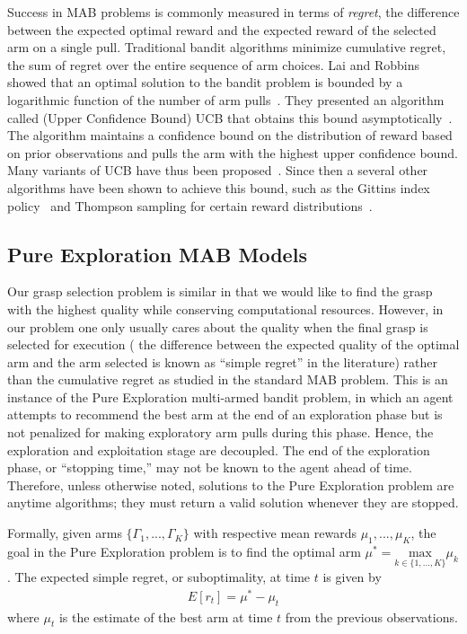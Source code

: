 \documentclass[journal,transmag]{IEEEtran}%
\begin{document}
Success in MAB problems is commonly measured in terms of {\it regret}, the difference between the expected optimal reward and the expected reward of the selected arm on a single pull.
Traditional bandit algorithms minimize cumulative regret, the sum of regret over the entire sequence of arm choices.
Lai and Robbins showed that an optimal solution to the bandit problem is bounded by a logarithmic function of the number of arm pulls~\cite{lai1985asymptotically}.
They presented an algorithm called (Upper Confidence Bound) UCB that obtains this bound asymptotically~\cite{lai1985asymptotically}.
The algorithm maintains a confidence bound on the distribution of reward based on prior observations and pulls the arm with the highest upper confidence bound.
Many variants of UCB have thus been proposed~\cite{}. 
Since then a several other algorithms have been shown to achieve this bound, such as the Gittins index policy~\cite{} and Thompson sampling for certain reward distributions~\cite{}.

\subsection{Pure Exploration MAB Models}
Our grasp selection problem is similar in that we would like to find the grasp with the highest quality while conserving computational resources.
However, in our problem one only usually cares about the quality when the final grasp is selected for execution ( the difference between the expected quality of the optimal arm and the arm selected is known as ``simple regret'' in the literature) rather than the cumulative regret as studied in the standard MAB problem.
This is an instance of the Pure Exploration multi-armed bandit problem\cite{bubeck2009pure}, in which an agent attempts to recommend the best arm at the end of an exploration phase but is not penalized for making exploratory arm pulls during this phase.
Hence, the exploration and exploitation stage are decoupled. 
The end of the exploration phase, or ``stopping time,'' may not be known to the agent ahead of time.
Therefore, unless otherwise noted, solutions to the Pure Exploration problem are anytime algorithms; they must return a valid solution whenever they are stopped.

Formally, given arms $\lbrace \Gamma_1, ..., \Gamma_K \rbrace$ with respective mean rewards $\mu_1, ..., \mu_K$, the goal in the Pure Exploration problem is to find the optimal arm $\mu^* = \underset{k\in\lbrace 1, ..., K \rbrace}{\mbox{max}} \mu_k$.
The expected simple regret, or suboptimality, at time $t$ is given by
\begin{align}\label{eq:simple_regret}
E[r_t] = \mu^* - \mu_t
\end{align}
\noindent where $\mu_t$ is the estimate of the best arm at time $t$ from the previous observations.
\end{document}
